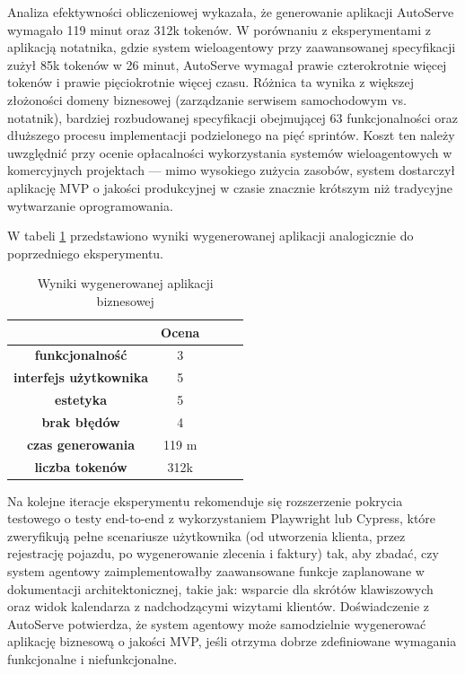 Analiza efektywności obliczeniowej wykazała, że generowanie aplikacji AutoServe wymagało 119 minut oraz 312k tokenów. W porównaniu z eksperymentami z aplikacją notatnika, gdzie system wieloagentowy przy zaawansowanej specyfikacji zużył 85k tokenów w 26 minut, AutoServe wymagał prawie czterokrotnie więcej tokenów i prawie pięciokrotnie więcej czasu. Różnica ta wynika z większej złożoności domeny biznesowej (zarządzanie serwisem samochodowym vs. notatnik), bardziej rozbudowanej specyfikacji obejmującej 63 funkcjonalności oraz dłuższego procesu implementacji podzielonego na pięć sprintów. Koszt ten należy uwzględnić przy ocenie opłacalności wykorzystania systemów wieloagentowych w komercyjnych projektach — mimo wysokiego zużycia zasobów, system dostarczył aplikację MVP o jakości produkcyjnej w czasie znacznie krótszym niż tradycyjne wytwarzanie oprogramowania.

W tabeli \ref{table:wyniki-wygenerowanej-aplikacji-biznesowej} przedstawiono wyniki wygenerowanej aplikacji analogicznie do poprzedniego eksperymentu.

\begin{table}[h!]
    \centering
    \begin{tabular}{|c|c|c|c|c|}
    \hline
    & \textbf{Ocena} \\
    \hline
    \textbf{funkcjonalność} & 3 \\
    \hline
    \textbf{interfejs użytkownika} & 5 \\
    \hline
    \textbf{estetyka} & 5 \\
    \hline
    \textbf{brak błędów} & 4 \\
    \hline
    \textbf{czas generowania} & 119 m \\
    \hline
    \textbf{liczba tokenów} & 312k \\
    \hline
    \end{tabular}
    \caption{Wyniki wygenerowanej aplikacji biznesowej}
    \label{table:wyniki-wygenerowanej-aplikacji-biznesowej}
\end{table}

Na kolejne iteracje eksperymentu rekomenduje się rozszerzenie pokrycia testowego o testy end-to-end z wykorzystaniem Playwright lub Cypress, które zweryfikują pełne scenariusze użytkownika (od utworzenia klienta, przez rejestrację pojazdu, po wygenerowanie zlecenia i faktury) tak, aby zbadać, czy system agentowy zaimplementowałby zaawansowane funkcje zaplanowane w dokumentacji architektonicznej, takie jak: wsparcie dla skrótów klawiszowych oraz widok kalendarza z nadchodzącymi wizytami klientów. Doświadczenie z AutoServe potwierdza, że system agentowy może samodzielnie wygenerować aplikację biznesową o jakości MVP, jeśli otrzyma dobrze zdefiniowane wymagania funkcjonalne i niefunkcjonalne.

\clearpage